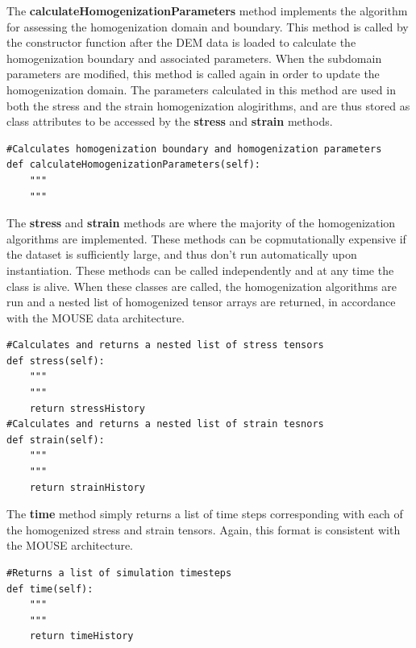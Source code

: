 The \textbf{calculateHomogenizationParameters} method implements the algorithm for assessing the homogenization domain and boundary. This method is called by the constructor function after the DEM data is loaded to calculate the homogenization boundary and associated parameters. When the subdomain parameters are modified, this method is called again in order to update the homogenization domain. The parameters calculated in this method are used in both the stress and the strain homogenization alogirithms, and are thus stored as class attributes to be accessed by the \textbf{stress} and \textbf{strain} methods. 

\begin{lstlisting}[frame=single]                
#Calculates homogenization boundary and homogenization parameters
def calculateHomogenizationParameters(self):
	"""
	"""
\end{lstlisting}

The \textbf{stress} and \textbf{strain} methods are where the majority of the homogenization algorithms are implemented. These methods can be copmutationally expensive if the dataset is sufficiently large, and thus don't run automatically upon instantiation. These methods can be called independently and at any time the class is alive. When these classes are called, the homogenization algorithms are run and a nested list of homogenized tensor arrays are returned, in accordance with the MOUSE data architecture. 
                   
\begin{lstlisting}[frame=single]      
#Calculates and returns a nested list of stress tensors
def stress(self):
	"""
	"""
	return stressHistory
#Calculates and returns a nested list of strain tesnors
def strain(self):
	"""
	"""
	return strainHistory
\end{lstlisting}

The \textbf{time} method simply returns a list of time steps corresponding with each of the homogenized stress and strain tensors. Again, this format is consistent with the MOUSE architecture.

\begin{lstlisting}[frame=single]      
#Returns a list of simulation timesteps
def time(self):
	"""
	"""
	return timeHistory
\end{lstlisting}
